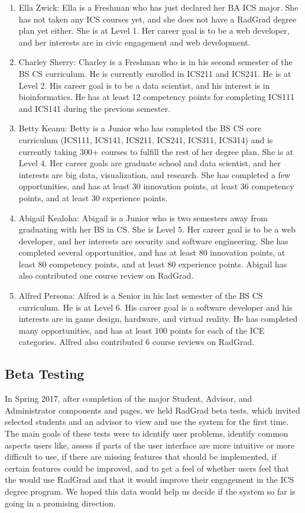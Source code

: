 \begin{enumerate}
  \item Ella Zwick: Ella is a Freshman who has just declared her BA ICS major. She has not taken any ICS courses yet, and she does not have a RadGrad degree plan yet either. She is at Level 1. Her career goal is to be a web developer, and her interests are in civic engagement and web development. 
  \item Charley Sherry: Charley is a Freshman who is in his second semester of the BS CS curriculum. He is currently enrolled in ICS211 and ICS241. He is at Level 2. His career goal is to be a data scientist, and his interest is in bioinformatics.  He has at least 12 competency points for completing ICS111 and ICS141 during the previous semester. 
  \item Betty Keanu: Betty is a Junior who has completed the BS CS core curriculum (ICS111, ICS141, ICS211, ICS241, ICS311, ICS314) and is currently taking 300+ courses to fulfill the rest of her degree plan. She is at Level 4. Her career goals are graduate school and data scientist, and her interests are big data, visualization, and research. She has completed a few opportunities, and has at least 30 innovation points, at least 36 competency points, and at least 30 experience points. 
  \item Abigail Kealoha: Abigail is a Junior who is two semesters away from graduating with her BS in CS. She is Level 5. Her career goal is to be a web developer, and her interests are security and software engineering. She has completed several opportunities, and has at least 80 innovation points, at least 80 competency points, and at least 80 experience points. Abigail has also contributed one course review on RadGrad. 
  \item Alfred Persona: Alfred is a Senior in his last semester of the BS CS curriculum. He is at Level 6. His career goal is a software developer and his interests are in game design, hardware, and virtual reality. He has completed many opportunities, and has at least 100 points for each of the ICE categories. Alfred also contributed 6 course reviews on RadGrad.
\end{enumerate} 

\subsection{Beta Testing}
In Spring 2017, after completion of the major Student, Advisor, and Administrator components and pages, we held RadGrad beta tests, which invited selected students and an advisor to view and use the system for the first time. The main goals of these tests were to identify user problems, identify common aspects users like, assess if parts of the user interface are more intuitive or more difficult to use, if there are missing features that should be implemented, if certain features could be improved, and to get a feel of whether users feel that the would use RadGrad and that it would improve their engagement in the ICS degree program. We hoped this data would help us decide if the system so far is going in a promising direction.

